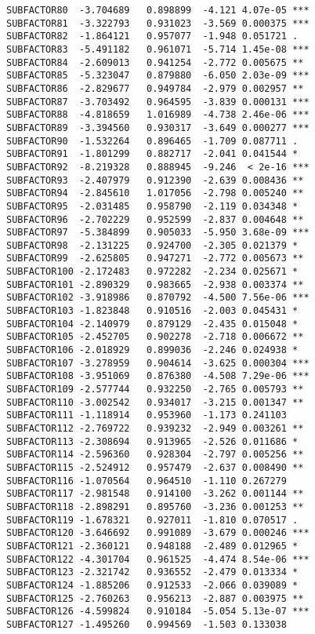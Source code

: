 \documentclass[]{book}
\begin{document}
\begin{verbatim}
SUBFACTOR80  -3.704689   0.898899  -4.121 4.07e-05 ***
SUBFACTOR81  -3.322793   0.931023  -3.569 0.000375 ***
SUBFACTOR82  -1.864121   0.957077  -1.948 0.051721 .  
SUBFACTOR83  -5.491182   0.961071  -5.714 1.45e-08 ***
SUBFACTOR84  -2.609013   0.941254  -2.772 0.005675 ** 
SUBFACTOR85  -5.323047   0.879880  -6.050 2.03e-09 ***
SUBFACTOR86  -2.829677   0.949784  -2.979 0.002957 ** 
SUBFACTOR87  -3.703492   0.964595  -3.839 0.000131 ***
SUBFACTOR88  -4.818659   1.016989  -4.738 2.46e-06 ***
SUBFACTOR89  -3.394560   0.930317  -3.649 0.000277 ***
SUBFACTOR90  -1.532264   0.896465  -1.709 0.087711 .  
SUBFACTOR91  -1.801299   0.882717  -2.041 0.041544 *  
SUBFACTOR92  -8.219328   0.888945  -9.246  < 2e-16 ***
SUBFACTOR93  -2.407979   0.912390  -2.639 0.008436 ** 
SUBFACTOR94  -2.845610   1.017056  -2.798 0.005240 ** 
SUBFACTOR95  -2.031485   0.958790  -2.119 0.034348 *  
SUBFACTOR96  -2.702229   0.952599  -2.837 0.004648 ** 
SUBFACTOR97  -5.384899   0.905033  -5.950 3.68e-09 ***
SUBFACTOR98  -2.131225   0.924700  -2.305 0.021379 *  
SUBFACTOR99  -2.625805   0.947271  -2.772 0.005673 ** 
SUBFACTOR100 -2.172483   0.972282  -2.234 0.025671 *  
SUBFACTOR101 -2.890329   0.983665  -2.938 0.003374 ** 
SUBFACTOR102 -3.918986   0.870792  -4.500 7.56e-06 ***
SUBFACTOR103 -1.823848   0.910516  -2.003 0.045431 *  
SUBFACTOR104 -2.140979   0.879129  -2.435 0.015048 *  
SUBFACTOR105 -2.452705   0.902278  -2.718 0.006672 ** 
SUBFACTOR106 -2.018929   0.899036  -2.246 0.024938 *  
SUBFACTOR107 -3.278959   0.904614  -3.625 0.000304 ***
SUBFACTOR108 -3.951069   0.876380  -4.508 7.29e-06 ***
SUBFACTOR109 -2.577744   0.932250  -2.765 0.005793 ** 
SUBFACTOR110 -3.002542   0.934017  -3.215 0.001347 ** 
SUBFACTOR111 -1.118914   0.953960  -1.173 0.241103    
SUBFACTOR112 -2.769722   0.939232  -2.949 0.003261 ** 
SUBFACTOR113 -2.308694   0.913965  -2.526 0.011686 *  
SUBFACTOR114 -2.596360   0.928304  -2.797 0.005256 ** 
SUBFACTOR115 -2.524912   0.957479  -2.637 0.008490 ** 
SUBFACTOR116 -1.070564   0.964510  -1.110 0.267279    
SUBFACTOR117 -2.981548   0.914100  -3.262 0.001144 ** 
SUBFACTOR118 -2.898291   0.895760  -3.236 0.001253 ** 
SUBFACTOR119 -1.678321   0.927011  -1.810 0.070517 .  
SUBFACTOR120 -3.646692   0.991089  -3.679 0.000246 ***
SUBFACTOR121 -2.360121   0.948188  -2.489 0.012965 *  
SUBFACTOR122 -4.301704   0.961525  -4.474 8.54e-06 ***
SUBFACTOR123 -2.321742   0.936552  -2.479 0.013334 *  
SUBFACTOR124 -1.885206   0.912533  -2.066 0.039089 *  
SUBFACTOR125 -2.760263   0.956213  -2.887 0.003975 ** 
SUBFACTOR126 -4.599824   0.910184  -5.054 5.13e-07 ***
SUBFACTOR127 -1.495260   0.994569  -1.503 0.133038    

\end{verbatim}
\end{document}
